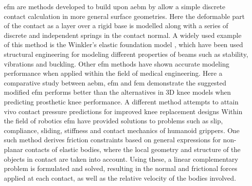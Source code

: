 \gls{efm} are methods developed to build upon \gls{aebm} by allow a simple discrete contact calculation in more general surface geometries. Here the deformable part of the contact as a layer over a rigid base is modelled along with a series of discrete and independent springs in the contact normal. A widely used example of this method is the Winkler's elastic foundation model \cite*{kl-johnson-and-contact-mechanics}, which have been used structural engineering for modeling different properties of beams such as stability\cite{stability-of-a-timoshenko-beam-resting-on-a-winkler-elastic-foundation}, vibrations and buckling\cite*{vibrations-and-buckling-of-a-beam-on-a-variable-winkler-elastic-foundation}. Other \gls{efm} methods have shown accurate modeling performance when applied within the field of medical engineering. Here a comparative study between \gls{aebm}, \gls{efm} and \gls{fem} demonstrate the suggested modified \gls{efm} performs better than the alternatives in 3D knee models when predicting prosthetic knee performance\cite*{a-modified-elastic-foundation-contact-model-for-application-in-3d-models-of-the-prosthetic-knee}. A different method attempts to attain vivo contact pressure predictions for improved knee replacement designs\cite*{experimental-evaluation-of-an-elastic-foundation-model-to-predict-contact-pressures-in-knee-replacements}
Within the field of robotics \gls{efm} have provided solutions to problems such as slip\cite{the-sliding-of-robot-fingers-under-combined-torsion-and-shear-loading}, compliance, sliding\cite*{quasistatic-manipulation-with-compliance-and-sliding}\cite*{practical-force-motion-models-for-sliding-manipulation}, stiffness and contact mechanics\cite*{stiffness-and-contact-mechanics-for-soft-fingers-in-grasping-and-manipulation} of humanoid grippers.
One such method derives friction constraints based on general expressions for non-planar contacts of elastic bodies, where the local geometry and structure of the objects in contact are taken into account. Using these, a linear complementary problem is formulated and solved, resulting in the normal and frictional forces applied at each contact, as well as the relative velocity of the bodies involved\cite*{soft-finger-model-with-adaptive-contact-geometry-for-grasping-and-manipulation-tasks}. \medskip

